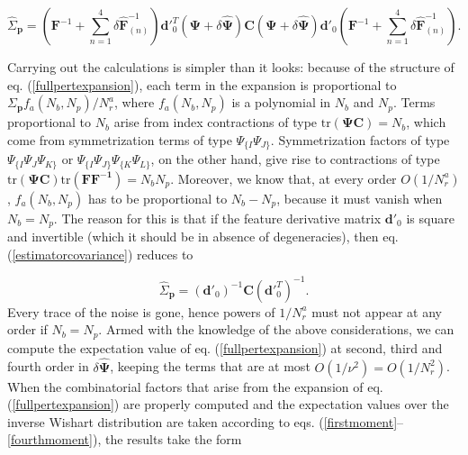 \documentclass[reprint,aps,prd,superscriptaddress,showkeys,showpacs]{revtex4-1}
\newcommand{\bb}[1]{\mathbf{#1}}
\newcommand{\bbh}[1]{\mathbf{\hat{#1}}}
\newcommand{\h}[1]{\hat{#1}}
\begin{document}
\begin{widetext}
\begin{equation}
\label{fullpertexpansion}
\h{\Sigma}_\bb{p} = \left(\bb{F}^{-1}+\sum_{n=1}^4\delta\bbh{F}^{-1}_{(n)}\right)\bb{d}'^T_0(\bb{\Psi}+\delta\bbh{\Psi})\bb{C}(\bb{\Psi}+\delta\bbh{\Psi})\bb{d}'_0\left(\bb{F}^{-1}+\sum_{n=1}^4\delta\bbh{F}^{-1}_{(n)}\right).
\end{equation}
\end{widetext}
%
Carrying out the calculations is simpler than it looks: because of the
structure of eq. (\ref{fullpertexpansion}), each term in the expansion
is proportional to $\Sigma_\bb{p}f_a(N_b,N_p)/N_r^a$, where
$f_a(N_b,N_p)$ is a polynomial in $N_b$ and $N_p$. Terms proportional
to $N_b$ arise from index contractions of type $\mathrm{tr}(\bb{\Psi
  C})=N_b$, which come from symmetrization terms of type
$\Psi_{\{I}\Psi_{J\}}$. Symmetrization factors of type
$\Psi_{\{I}\Psi_J\Psi_{K\}}$ or $\Psi_{\{I}\Psi_{J\}}\Psi_{\{K}\Psi_{L\}}$,
on the other hand, give rise to contractions of type
$\mathrm{tr}(\bb{\Psi
  C})\mathrm{tr}(\bb{\bb{F}\bb{F}^{-1}})=N_bN_p$. Moreover, we know
that, at every order $O(1/N_r^a)$, $f_a(N_b,N_p)$ has to be
proportional to $N_b-N_p$, because it must vanish when $N_b=N_p$. The
reason for this is that if the feature derivative matrix $\bb{d}'_0$
is square and invertible (which it should be in absence of
degeneracies), then eq. (\ref{estimatorcovariance}) reduces to

\begin{equation}
\h{\Sigma}_\bb{p} = (\bb{d}'_0)^{-1}\bb{C}(\bb{d}'^T_0)^{-1}.
\end{equation} 
%
Every trace of the noise is gone, hence powers of $1/N_r^a$ must not
appear at any order if $N_b=N_p$. Armed with the knowledge of the
above considerations, we can compute the expectation value of
eq. (\ref{fullpertexpansion}) at second, third and fourth order in
$\delta\bbh{\Psi}$, keeping the terms that are at most
$O(1/\nu^2)=O(1/N_r^2)$. When the combinatorial factors that arise
from the expansion of eq. (\ref{fullpertexpansion}) are properly
computed and the expectation values over the inverse Wishart
distribution are taken according to
eqs. (\ref{firstmoment}--\ref{fourthmoment}), the results take the form
\end{document}
